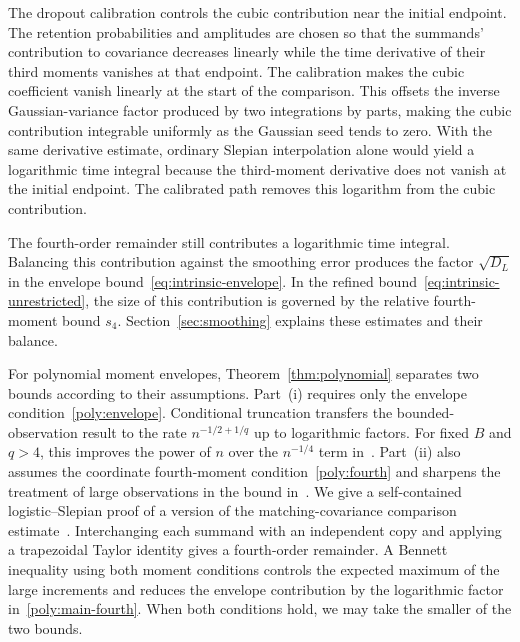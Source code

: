\documentclass[11pt,letterpaper,twoside,leqno]{article}
\theoremstyle{bookplain}
\theoremstyle{bookremark}
\begin{document}
The dropout calibration controls the cubic contribution near the
initial endpoint. The retention probabilities and amplitudes are
chosen so that the summands' contribution to covariance decreases
linearly while the time derivative of their third moments vanishes
at that endpoint. The calibration makes the cubic coefficient vanish linearly
at the start of the comparison. This offsets the inverse
Gaussian-variance factor produced by two integrations by parts,
making the cubic contribution integrable uniformly as the Gaussian
seed tends to zero. With the same derivative estimate, ordinary
Slepian interpolation alone would yield a logarithmic time integral
because the third-moment derivative does not vanish at the initial
endpoint. The calibrated path removes this logarithm from the cubic
contribution.

The fourth-order remainder still contributes a logarithmic time
integral. Balancing this contribution against the smoothing error
produces the factor \(\sqrt{D_L}\) in the envelope
bound~\eqref{eq:intrinsic-envelope}. In the refined
bound~\eqref{eq:intrinsic-unrestricted}, the size of this contribution
is governed by the relative fourth-moment bound \(s_4\).
Section~\ref{sec:smoothing} explains these estimates and their balance.

For polynomial moment envelopes, Theorem~\ref{thm:polynomial}
separates two bounds according to their assumptions.
Part~\textup{(i)} requires only the envelope
condition~\eqref{poly:envelope}. Conditional truncation transfers
the bounded-observation result to the rate \(n^{-1/2+1/q}\) up to
logarithmic factors. For fixed \(B\) and \(q>4\), this improves
the power of \(n\) over the \(n^{-1/4}\) term
in~\cite[Theorem~2.5]{CCKK2022}. Part~\textup{(ii)} also assumes
the coordinate fourth-moment condition~\eqref{poly:fourth} and
sharpens the treatment of large observations in the bound
in~\cite{CCKK2022}. We give a self-contained logistic--Slepian
proof of a version of the matching-covariance comparison
estimate~\cite[Lemma~A.1]{CCKK2022}. Interchanging each summand
with an independent copy and applying a trapezoidal Taylor identity
gives a fourth-order remainder. A Bennett inequality using both
moment conditions controls the expected maximum of the large
increments and reduces the envelope contribution by the logarithmic
factor in~\eqref{poly:main-fourth}. When both conditions hold,
we may take the smaller of the two bounds.
\end{document}
